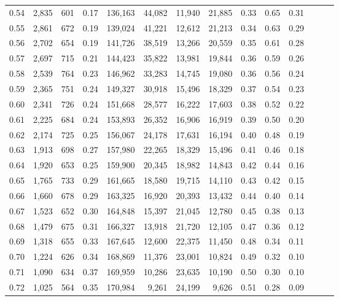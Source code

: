 \begin{tabular}{rrrrrrrrrrrrrr}
0.54 &  2,835 &  601 &  0.17 &  136,163 &   44,082 &  11,940 &  21,885 &  0.33 &  0.65 &      0.31 \\
0.55 &  2,861 &  672 &  0.19 &  139,024 &   41,221 &  12,612 &  21,213 &  0.34 &  0.63 &      0.29 \\
0.56 &  2,702 &  654 &  0.19 &  141,726 &   38,519 &  13,266 &  20,559 &  0.35 &  0.61 &      0.28 \\
0.57 &  2,697 &  715 &  0.21 &  144,423 &   35,822 &  13,981 &  19,844 &  0.36 &  0.59 &      0.26 \\
0.58 &  2,539 &  764 &  0.23 &  146,962 &   33,283 &  14,745 &  19,080 &  0.36 &  0.56 &      0.24 \\
0.59 &  2,365 &  751 &  0.24 &  149,327 &   30,918 &  15,496 &  18,329 &  0.37 &  0.54 &      0.23 \\
0.60 &  2,341 &  726 &  0.24 &  151,668 &   28,577 &  16,222 &  17,603 &  0.38 &  0.52 &      0.22 \\
0.61 &  2,225 &  684 &  0.24 &  153,893 &   26,352 &  16,906 &  16,919 &  0.39 &  0.50 &      0.20 \\
0.62 &  2,174 &  725 &  0.25 &  156,067 &   24,178 &  17,631 &  16,194 &  0.40 &  0.48 &      0.19 \\
0.63 &  1,913 &  698 &  0.27 &  157,980 &   22,265 &  18,329 &  15,496 &  0.41 &  0.46 &      0.18 \\
0.64 &  1,920 &  653 &  0.25 &  159,900 &   20,345 &  18,982 &  14,843 &  0.42 &  0.44 &      0.16 \\
0.65 &  1,765 &  733 &  0.29 &  161,665 &   18,580 &  19,715 &  14,110 &  0.43 &  0.42 &      0.15 \\
0.66 &  1,660 &  678 &  0.29 &  163,325 &   16,920 &  20,393 &  13,432 &  0.44 &  0.40 &      0.14 \\
0.67 &  1,523 &  652 &  0.30 &  164,848 &   15,397 &  21,045 &  12,780 &  0.45 &  0.38 &      0.13 \\
0.68 &  1,479 &  675 &  0.31 &  166,327 &   13,918 &  21,720 &  12,105 &  0.47 &  0.36 &      0.12 \\
0.69 &  1,318 &  655 &  0.33 &  167,645 &   12,600 &  22,375 &  11,450 &  0.48 &  0.34 &      0.11 \\
0.70 &  1,224 &  626 &  0.34 &  168,869 &   11,376 &  23,001 &  10,824 &  0.49 &  0.32 &      0.10 \\
0.71 &  1,090 &  634 &  0.37 &  169,959 &   10,286 &  23,635 &  10,190 &  0.50 &  0.30 &      0.10 \\
0.72 &  1,025 &  564 &  0.35 &  170,984 &    9,261 &  24,199 &   9,626 &  0.51 &  0.28 &      0.09 \\

\end{tabular}
